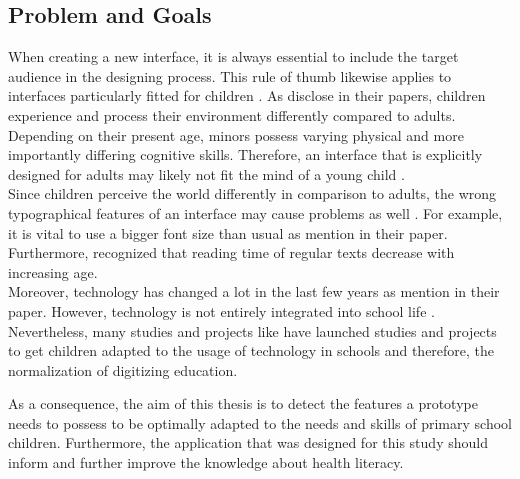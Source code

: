 \subsection{Problem and Goals}
\label{subsection:ProblemGoals}
When creating a new interface, it is always essential to include the target audience in the designing process. This rule of thumb likewise applies to interfaces particularly fitted for children \autocite{gossen2012search, alhussayen2015evaluating}. As \textcite{gossen2012search, alhussayen2015evaluating} disclose in their papers, children experience and process their environment differently compared to adults. Depending on their present age, minors possess varying physical and more importantly differing cognitive skills. Therefore, an interface that is explicitly designed for adults may likely not fit the mind of a young child \autocite{alhussayen2015evaluating}.\\
Since children perceive the world differently in comparison to adults, the wrong typographical features of an interface may cause problems as well \autocite{adattil2018effects}. For example, it is vital to use a bigger font size than usual as \textcite{adattil2018effects} mention in their paper. Furthermore,  \textcite{adattil2018effects} recognized that reading time of regular texts decrease with increasing age.\\
Moreover, technology has changed a lot in the last few years as \textcite{liu2005reading} mention in their paper. However, technology is not entirely integrated into school life \autocite{engen2014ipads}. Nevertheless, many studies and projects like \textcite{walker2000screen, kerawalla2006making, engen2014ipads} have launched studies and projects to get children adapted to the usage of technology in schools and therefore, the normalization of digitizing education.

As a consequence, the aim of this thesis is to detect the features a prototype needs to possess to be optimally adapted to the needs and skills of primary school children. Furthermore, the application that was designed for this study should inform and further improve the knowledge about health literacy.

